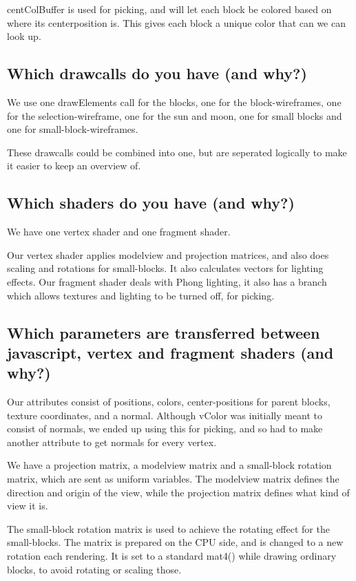 centColBuffer is used for picking, and will let each block be colored based on where its centerposition is.
This gives each block a unique color that can we can look up. 

\subsection{Which drawcalls do you have (and why?)}

We use one drawElements call for the blocks, one for the block-wireframes, one for the selection-wireframe, one for the sun and moon,
one for small blocks and one for small-block-wireframes.

These drawcalls could be combined into one, but are seperated logically 
to make it easier to keep an overview of.

\subsection{Which shaders do you have (and why?)}

We have one vertex shader and one fragment shader. 

Our vertex shader applies modelview and projection matrices, 
and also does scaling and rotations for small-blocks. It also calculates vectors for lighting effects.
Our fragment shader deals with Phong lighting, 
it also has a branch which allows textures and lighting to be turned off, for picking.

\subsection{Which parameters are transferred between javascript, 
vertex and fragment shaders (and why?)}

Our attributes consist of positions, colors, center-positions for parent blocks, texture coordinates, and a normal.
Although vColor was initially meant to consist of normals, we ended up using this for picking, 
and so had to make another attribute to get normals for every vertex.

We have a projection matrix, a modelview matrix and a small-block rotation matrix, which are sent as uniform variables.
The modelview matrix defines the direction and origin of the view, while the projection matrix defines what kind of view it is.

The small-block rotation matrix is used to achieve the rotating effect for the small-blocks. 
The matrix is prepared on the CPU side, and is changed to a new rotation each rendering.
It is set to a standard mat4() while drawing ordinary blocks, to avoid rotating or scaling those.

